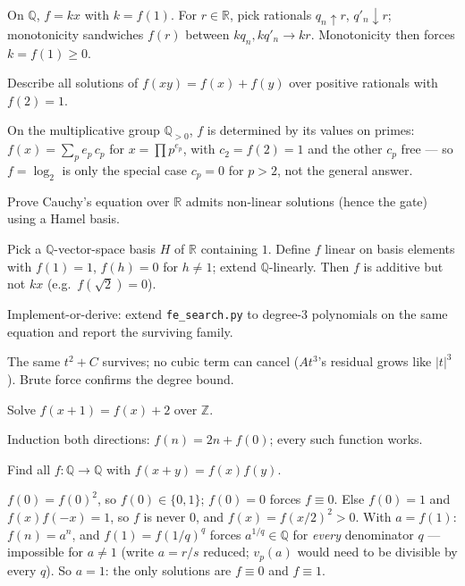 \begin{solution}
On $\mathbb Q$, $f=kx$ with $k=f(1)$. For $r\in\mathbb R$, pick rationals
$q_n\uparrow r$, $q'_n\downarrow r$; monotonicity sandwiches
$f(r)$ between $kq_n, kq'_n \to kr$. Monotonicity then forces
$k = f(1) \ge 0$.
\end{solution}
\begin{exercise}[medium]\label{exr:fa8}
Describe all solutions of $f(xy)=f(x)+f(y)$ over positive rationals
with $f(2)=1$.
\end{exercise}
\begin{solution}
On the multiplicative group $\mathbb Q_{>0}$, $f$ is determined by its
values on primes: $f(x)=\sum_p e_p\,c_p$ for $x=\prod p^{e_p}$, with
$c_2 = f(2) = 1$ and the other $c_p$ free --- so $f=\log_2$ is only
the special case $c_p=0$ for $p>2$, not the general answer.
\end{solution}
\begin{exercise}[hard]\label{exr:fa9}
Prove Cauchy's equation over $\mathbb R$ admits non-linear solutions
(hence the gate) using a Hamel basis.
\end{exercise}
\begin{solution}
Pick a $\mathbb Q$-vector-space basis $H$ of $\mathbb R$ containing $1$.
Define $f$ linear on basis elements with $f(1)=1$, $f(h)=0$ for
$h\ne1$; extend $\mathbb Q$-linearly. Then $f$ is additive but not $kx$
(e.g.\ $f(\sqrt2)=0$).
\end{solution}
\begin{exercise}[hard]\label{exr:fa10}
Implement-or-derive: extend \texttt{fe\_search.py} to degree-3
polynomials on the same equation and report the surviving family.
\end{exercise}
\begin{solution}
The same $t^2+C$ survives; no cubic term can cancel ($A t^3$'s residual
grows like $|t|^3$). Brute force confirms the degree bound.
\end{solution}
\begin{exercise}[easy]\label{exr:fa11}
Solve $f(x+1)=f(x)+2$ over $\mathbb Z$.
\end{exercise}
\begin{solution}
Induction both directions: $f(n)=2n+f(0)$; every such function works.
\end{solution}
\begin{exercise}[medium]\label{exr:fa12}
Find all $f:\mathbb Q\to\mathbb Q$ with $f(x+y)=f(x)f(y)$.
\end{exercise}
\begin{solution}
$f(0)=f(0)^2$, so $f(0)\in\{0,1\}$; $f(0)=0$ forces $f\equiv0$. Else
$f(0)=1$ and $f(x)f(-x)=1$, so $f$ is never $0$, and
$f(x)=f(x/2)^2>0$. With $a=f(1)$: $f(n)=a^n$, and
$f(1)=f(1/q)^q$ forces $a^{1/q}\in\mathbb Q$ for \emph{every}
denominator $q$ --- impossible for $a\neq1$ (write $a=r/s$ reduced;
$v_p(a)$ would need to be divisible by every $q$). So $a=1$: the only
solutions are $f\equiv0$ and $f\equiv1$.
\end{solution}
